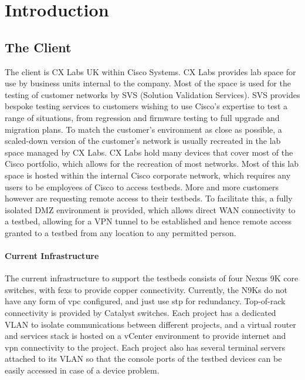 \chapter{Introduction}
\label{chap:intro}

\section{The Client}
\label{intro:client}

The client is CX Labs UK within Cisco Systems. CX Labs provides lab space for
use by business units internal to the company. Most of the space is used for
the testing of customer networks by SVS (Solution Validation Services). SVS
provides bespoke testing services to customers wishing to use Cisco’s expertise
to test a range of situations, from regression and firmware testing to full
upgrade and migration plans.\newline
To match the customer's environment as close as possible, a scaled-down
version of the customer's network is usually recreated in the lab space managed
by CX Labs. CX Labs hold many devices that cover most of the Cisco portfolio,
which allows for the recreation of most networks. Most of this lab space is
hosted within the internal Cisco corporate network, which requires any users to
be employees of Cisco to access testbeds. More and more customers
however are requesting remote access to their testbeds. To facilitate this, a
fully isolated DMZ environment is provided, which allows direct WAN
connectivity to a testbed, allowing for a VPN tunnel to be established and
hence remote access granted to a testbed from any location to any permitted
person.

\subsubsection{Current Infrastructure}
The current infrastructure to support the testbeds consists of four Nexus 9K core switches, with \gls{fex}s to provide copper connectivity. Currently, the N9Ks do not have any form of \gls{vpc} configured, and just use \gls{stp} for redundancy. Top-of-rack connectivity is provided by Catalyst switches. Each project has a dedicated VLAN to isolate communications between different projects, and a virtual router and services stack is hosted on a vCenter environment to provide internet and \gls{vpn} connectivity to the project. Each project also has several terminal servers attached to its VLAN so that the console ports of the testbed devices can be easily accessed in case of a device problem.

